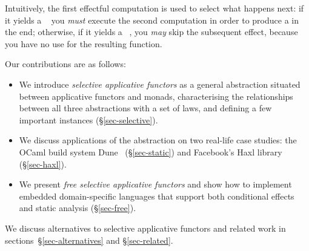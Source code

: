\noindent
Intuitively, the first effectful computation is used to select what happens
next: if it yields a ~ you \emph{must} execute the second
computation in order to produce a  in the end; otherwise, if it yields a
~, you \emph{may} skip the subsequent effect, because you have
no use for the resulting function.

Our contributions are as follows:

\vspace{-1mm}
\begin{itemize}
    \item We introduce \emph{selective applicative functors} as a general
    abstraction situated between applicative functors and monads, characterising
    the relationships between all three abstractions with a set of laws, and
    defining a few important instances (\S\ref{sec-selective}).
    \item We discuss applications of the abstraction on two real-life case
    studies: the OCaml build system Dune~\citep{dune} (\S\ref{sec-static}) and
    Facebook's Haxl library~\cite{marlow2014haxl} (\S\ref{sec-haxl}).
    \item We present \emph{free selective applicative functors} and show how to
    implement embedded domain-specific languages that support both conditional
    effects and static analysis (\S\ref{sec-free}).
\end{itemize}

We discuss alternatives to selective applicative functors and related work in
sections~\S\ref{sec-alternatives} and \S\ref{sec-related}.
